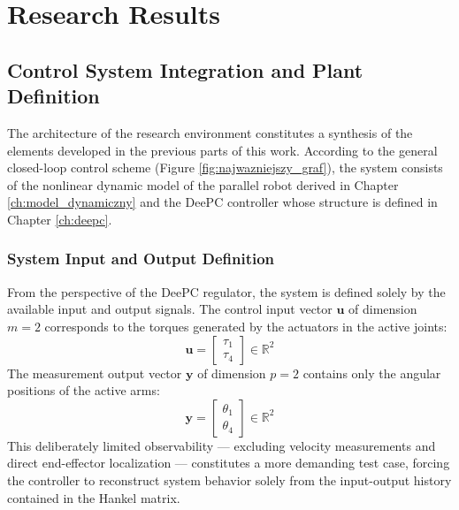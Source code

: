 \chapter{Research Results}
\label{ch:rezultaty}

\section{Control System Integration and Plant Definition}
\label{sec:integracja_systemu}

The architecture of the research environment constitutes a synthesis of the elements developed in the previous parts of this work. According to the general closed-loop control scheme (Figure \ref{fig:najwazniejszy_graf}), the system consists of the nonlinear dynamic model of the parallel robot derived in Chapter \ref{ch:model_dynamiczny} and the DeePC controller whose structure is defined in Chapter \ref{ch:deepc}.

\subsection{System Input and Output Definition}

From the perspective of the DeePC regulator, the system is defined solely by the available input and output signals. The control input vector $\boldsymbol{u}$ of dimension $m=2$ corresponds to the torques generated by the actuators in the active joints:
\begin{equation}
    \boldsymbol{u} =
    \begin{bmatrix}
        \tau_1 \\ \tau_4
    \end{bmatrix} \in \mathbb{R}^2
    \label{eq:input_definition}
\end{equation}
The measurement output vector $\boldsymbol{y}$ of dimension $p=2$ contains only the angular positions of the active arms:
\begin{equation}
    \boldsymbol{y} =
    \begin{bmatrix}
        \theta_1 \\ \theta_4
    \end{bmatrix} \in \mathbb{R}^2
    \label{eq:output_definition}
\end{equation}
This deliberately limited observability — excluding velocity measurements and direct end-effector localization — constitutes a more demanding test case, forcing the controller to reconstruct system behavior solely from the input-output history contained in the Hankel matrix.

